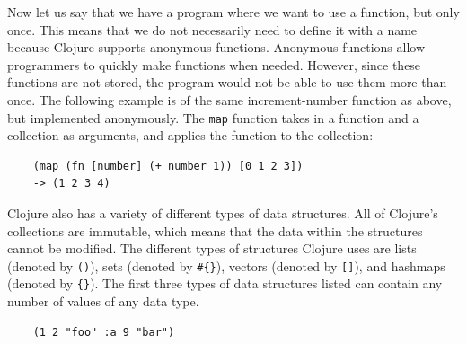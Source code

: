 \documentclass[12pt]{article}
\newcommand{\comment}[1]{{\bf \tt  {#1}}}
\newcommand{\emcomment}[1]{\textcolor{ForestGreen}{\comment{Elena: {#1}}}}
\newcommand{\mmcomment}[1]{\textcolor{magenta}{\comment{Max: {#1}}}}
\begin{document}
Now let us say that we have a program where we want to use a function, but only once. This means that
we do not necessarily need to define it with a name because Clojure supports anonymous functions.
Anonymous functions allow programmers to quickly make
functions when needed. 
However, since these functions are not  stored, the program would not be able to use them more than
once. 
The following example is of the same increment-number function as above, but implemented anonymously.
The \texttt{map} function takes in a function and a collection as arguments, and applies the function
to the collection: 
\begin{verbatim}
	(map (fn [number] (+ number 1)) [0 1 2 3])
	-> (1 2 3 4)
\end{verbatim}



Clojure also has a variety of different types of data structures. All 
of Clojure's collections are immutable, which means that the data within the structures cannot be
modified. 
The different types of structures Clojure uses are lists (denoted by \texttt{()}), sets (denoted by
\texttt{\#\{\}}), vectors (denoted by \texttt{[]}), and hashmaps (denoted by \texttt{\{\}}). The first
three types of data structures listed can contain any number of values of any data type.
\begin{verbatim}
	(1 2 "foo" :a 9 "bar")
\end{verbatim}
\end{document}
